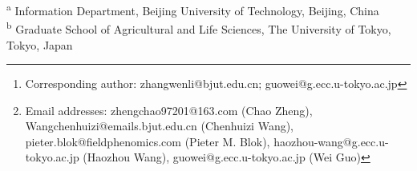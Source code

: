 \documentclass[12pt]{article}
\newcommand\blfootnote[1]{
    \begingroup
    \renewcommand\thefootnote{}\footnote{#1}
    \addtocounter{footnote}{-1}
    \endgroup
}
\begin{document}
\title{}
\author{
    Wenli Zhang \textsuperscript{a,*},
    Chao Zheng \textsuperscript{a},
    Chenhuizi Wang \textsuperscript{a},
    Pieter M. Blok \textsuperscript{b}, \\
    Haozhou Wang \textsuperscript{b},
    Wei Guo \textsuperscript{b,*}
    \blfootnote{Corresponding author: zhangwenli@bjut.edu.cn; guowei@g.ecc.u-tokyo.ac.jp }
    \blfootnote{Email addresses: zhengchao97201@163.com (Chao Zheng), Wangchenhuizi@emails.bjut.edu.cn (Chenhuizi Wang), pieter.blok@fieldphenomics.com (Pieter M. Blok), haozhou-wang@g.ecc.u-tokyo.ac.jp (Haozhou Wang), guowei@g.ecc.u-tokyo.ac.jp (Wei Guo)}
}
\date{}

\maketitle

\noindent\textsuperscript{a} Information Department, Beijing University of Technology, Beijing, China \\
\textsuperscript{b} Graduate School of Agricultural and Life Sciences, The University of Tokyo, Tokyo, Japan\\

\end{document}

